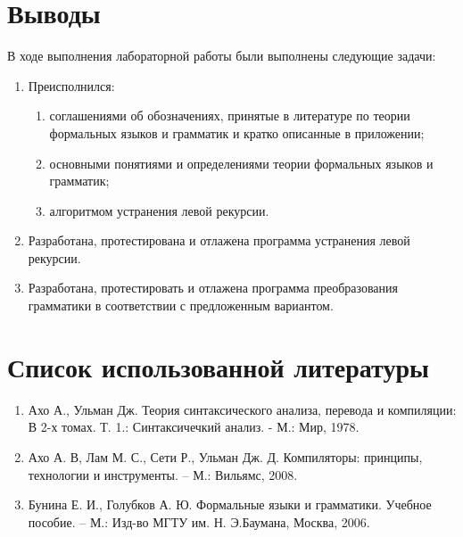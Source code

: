 \documentclass{bmstu-gost-7-32}
\begin{document}
\section*{Выводы}

В ходе выполнения лабораторной работы были выполнены следующие задачи:

\begin{enumerate}
	\item Преисполнился:
	\begin{enumerate}
		\item соглашениями об обозначениях, принятые в литературе по теории формальных языков и грамматик и кратко описанные в приложении;
		\item основными понятиями и определениями теории формальных языков и грамматик;
		\item алгоритмом устранения левой рекурсии.
	\end{enumerate}
	\item Разработана, протестирована и отлажена программа устранения левой рекурсии.
	\item Разработана, протестировать и отлажена программа преобразования грамматики в соответствии с предложенным вариантом.
\end{enumerate}

\section*{Список использованной литературы}

\begin{enumerate}
	\item Ахо А., Ульман Дж. Теория синтаксического анализа, перевода и компиляции: В 2-х томах. Т. 1.: Синтаксичечкий анализ. - М.: Мир, 1978.
	\item Ахо А. В, Лам М. С., Сети Р., Ульман Дж. Д. Компиляторы: принципы, технологии и инструменты. – М.: Вильямс, 2008.
	\item Бунина Е. И., Голубков А. Ю. Формальные языки и грамматики. Учебное пособие. – М.: Изд-во МГТУ им. Н. Э.Баумана, Москва, 2006.
\end{enumerate}
\end{document}
